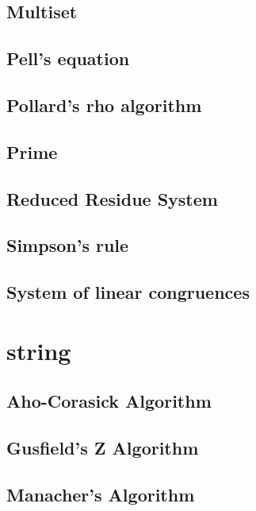 \documentclass[a4paper,5pt,twocolumn,titlepage]{article}
\begin{document}
\subsection{Multiset}

\subsection{Pell's equation}

\subsection{Pollard's rho algorithm}

\subsection{Prime}

\subsection{Reduced Residue System}

\subsection{Simpson's rule}

\subsection{System of linear congruences}


\section{string}
\subsection{Aho-Corasick Algorithm}

\subsection{Gusfield's Z Algorithm}

\subsection{Manacher's Algorithm}

\end{document}
